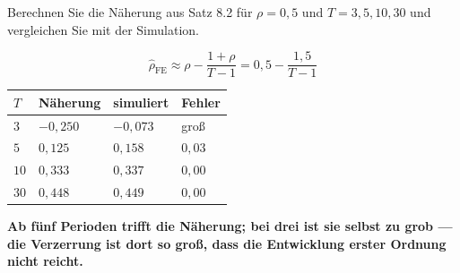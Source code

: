 \begin{aufgabe}
Berechnen Sie die Näherung aus Satz 8.2 für $\rho = 0{,}5$ und $T = 3, 5, 10, 30$ und vergleichen Sie mit der Simulation.

\loesung
{}
\[ \hat\rho_{\text{FE}} \approx \rho - \frac{1+\rho}{T-1} = 0{,}5 - \frac{1{,}5}{T-1} \]

\begin{center}
{\small
\renewcommand{\arraystretch}{1.48}
\begin{tabular}{@{}P{1.2cm}P{2.2cm}P{2.2cm}P{2.0cm}@{}}
\toprule
$T$ & \textbf{Näherung} & \textbf{simuliert} & \textbf{Fehler}\\
\midrule
$3$ & $-0{,}250$ & $-0{,}073$ & groß\\
$5$ & $0{,}125$ & $0{,}158$ & $0{,}03$\\
$10$ & $0{,}333$ & $0{,}337$ & $0{,}00$\\
$30$ & $0{,}448$ & $0{,}449$ & $0{,}00$\\
\bottomrule
\end{tabular}}
\end{center}

\begin{center}
\begin{minipage}{0.9\textwidth}
\textbf{Ab fünf Perioden trifft die Näherung; bei drei ist sie selbst zu grob --- die Verzerrung ist dort so groß, dass die Entwicklung erster Ordnung nicht reicht.}
\end{minipage}
\end{center}

\begin{center}
\begin{minipage}{0.88\textwidth}
\end{minipage}
\end{center}
\end{aufgabe}

